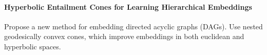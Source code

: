 \documentclass{article}
\begin{document}
\paragraph{Hyperbolic Entailment Cones for Learning Hierarchical Embeddings~\cite{ganea2018hyperbolic}}

Propose a new method for embedding directed acyclic graphs (DAGs). 
Use nested geodesically convex cones, which improve embeddings in both euclidean and hyperbolic spaces. 



\end{document}

